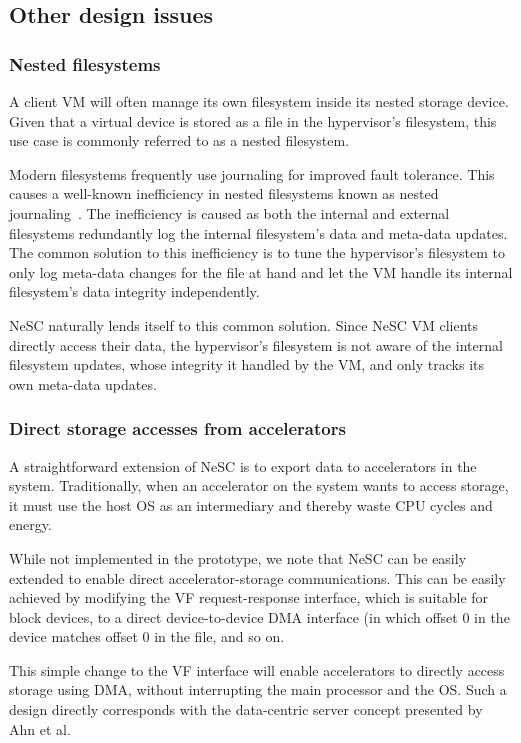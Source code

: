 \subsection{Other design issues}

\subsubsection*{Nested filesystems}
A client VM will often manage its own filesystem inside its nested storage device. Given that a virtual device is stored as a file in the hypervisor's filesystem, this use case is commonly referred to as a nested filesystem.

Modern filesystems frequently use journaling for improved fault tolerance. This causes a well-known inefficiency in nested filesystems known as nested journaling~\cite{le12nested}. The inefficiency is caused as both the internal and external filesystems redundantly log the internal filesystem's data and meta-data updates. The common solution to this inefficiency is to tune the hypervisor's filesystem to only log meta-data changes for the file at hand and let the VM handle its internal filesystem's data integrity independently.

NeSC naturally lends itself to this common solution. Since NeSC VM clients directly access their data, the hypervisor's filesystem is not aware of the internal filesystem updates, whose integrity it handled by the VM, and only tracks its own meta-data updates.

\subsubsection*{Direct storage accesses from accelerators}

A straightforward extension of NeSC is to export data to accelerators in the system.
Traditionally, when an accelerator on the system wants to access storage, it must use the host OS as an intermediary and thereby waste CPU cycles and energy.

While not implemented in the prototype, we note that NeSC can be easily extended to enable direct accelerator-storage communications. This can be easily achieved by modifying the VF request-response interface, which is suitable for block devices, to a direct device-to-device DMA interface (in which offset 0 in the device matches offset 0 in the file, and so on.

This simple change to the VF interface will enable accelerators to directly access storage using DMA, without interrupting the main processor and the OS. Such a design directly corresponds with the data-centric server concept presented by Ahn et al.~\cite{ahn2015dcs}
